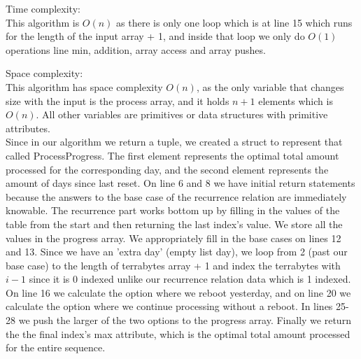 \documentclass[12pt]{article}
\begin{document}
Time complexity:\\
This algorithm is $O(n)$ as there is only one loop which is at line 15 which runs for the length of the input array + 1,
and inside that loop we only do $O(1)$ operations line min, addition, array access and array pushes.    \vspace{1em}

Space complexity:\\
This algorithm has space complexity $O(n)$, as the only variable that changes size with the input is the process array,
and it holds $n+1$ elements which is $O(n)$. All other variables are primitives or data structures with primitive attributes.\\

Since in our algorithm we return a tuple, we created a struct to represent that called ProcessProgress.
The first element represents the optimal total amount processed for the corresponding day, and the second
element represents the amount of days since last reset. On line 6 and 8 we have initial return statements
because the answers to the base case of the recurrence relation are immediately knowable.
The recurrence part works bottom up by filling in the values of the table from the start and
then returning the last index's value. We store all the values in the progress array.
We appropriately fill in the base cases on lines 12 and 13. Since we have an 'extra day' (empty list day),
we loop from 2 (past our base case) to the length of terrabytes array + 1 and index the terrabytes with $i-1$
since it is 0 indexed unlike our recurrence relation data which is 1 indexed. On line 16 we calculate
the option where we reboot yesterday, and on line 20 we calculate the option where we continue processing
without a reboot. In lines 25-28 we push the larger of the two options to the progress array.
Finally we return the the final index's max attribute, which is the optimal total amount processed for the entire sequence.
\end{document}
